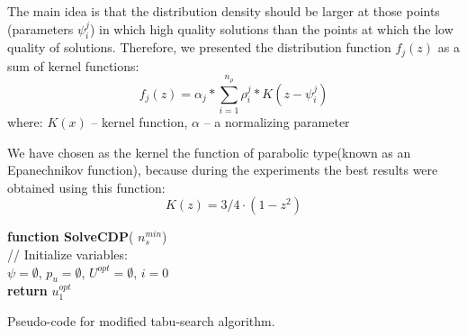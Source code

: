\documentclass[]{TAACpaper}
\begin{document}
The main idea is that the distribution density should be larger at those points (parameters $\psi^j_i$) in which high quality solutions than the points at which the low quality of solutions.
Therefore, we presented the distribution function $f_j(z)$ as a sum of kernel functions:
 \begin{equation} \label{dist_density}
 f_j(z) = \alpha_j * \sum\limits_{i=1}^{n_{\rho}}  \rho^j_i * K(z -  \psi^j_i)
 \end{equation}
 where: $K(x)$ -- kernel function, $ \alpha$ -- a normalizing parameter
 
 We have chosen as the kernel the function of parabolic type(known as an Epanechnikov function),  because during the experiments the best results were obtained using this function:
 \begin{equation} \label{dist_density}
  K(z) = 3/4 \cdot (1-z^2)
 \end{equation}
 

\begin{algorithm}[H]
	\textbf{function SolveCDP}( $n^{min}_s$) \\
	// Initialize variables:	\\
	
	$\psi = \emptyset$,
	$p_u = \emptyset$,
	$U^{opt} = \emptyset$,
	$i=0$ \\
	
	\textbf{return} $u^{opt}_1$
	
	\caption{Pseudo-code for modified tabu-search algorithm.}
	\label{alg:modTabuSearch}
\end{algorithm}
\end{document}
